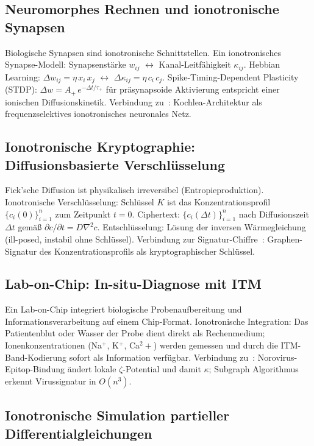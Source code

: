 ﻿\documentclass[a4paper,12pt]{article}
\theoremstyle{plain}
\theoremstyle{definition}
\theoremstyle{remark}
\begin{document}
\subsection{Neuromorphes Rechnen und ionotronische Synapsen}

Biologische Synapsen sind ionotronische Schnittstellen.
Ein ionotronisches Synapse-Modell:
Synapsenstärke $w_{ij}$ $\leftrightarrow$ Kanal-Leitfähigkeit $\kappa_{ij}$.
Hebbian Learning: $\Delta w_{ij} = \eta\,x_i\,x_j$
$\leftrightarrow$ $\Delta\kappa_{ij} = \eta\,c_i\,c_j$.
Spike-Timing-Dependent Plasticity (STDP):
$\Delta w = A_+\,e^{-\Delta t/\tau_+}$ f\"ur pr\"asynapsoide Aktivierung
entspricht einer ionischen Diffusionskinetik.
Verbindung zu~\cite{epp2026nf6}: Kochlea-Architektur als frequenzselektives
ionotronisches neuronales Netz.

\subsection{Ionotronische Kryptographie: Diffusionsbasierte Verschl\"usselung}

Fick'sche Diffusion ist physikalisch irreversibel (Entropieproduktion).
Ionotronische Verschl\"usselung: Schlüssel $K$ ist das Konzentrationsprofil
$\{c_i(0)\}_{i=1}^n$ zum Zeitpunkt $t=0$.
Ciphertext: $\{c_i(\Delta t)\}_{i=1}^n$ nach Diffusionszeit $\Delta t$
gem\"a{\ss} $\partial c/\partial t = D\nabla^2 c$.
Entschl\"usselung: L\"osung der inversen W\"armegleichung (ill-posed, instabil
ohne Schl\"ussel).
Verbindung zur Signatur-Chiffre~\cite{epp2026sigchiffre}:
Graphen-Signatur des Konzentrationsprofils als kryptographischer Schl\"ussel.

\subsection{Lab-on-Chip: In-situ-Diagnose mit ITM}

Ein Lab-on-Chip integriert biologische Probenaufbereitung und
Informationsverarbeitung auf einem Chip-Format.
Ionotronische Integration: Das Patientenblut oder Wasser der Probe
dient direkt als Rechenmedium; Ionenkonzentrationen (Na$^+$, K$^+$, Ca$^2+$)
werden gemessen und durch die ITM-Band-Kodierung sofort als Information
verfügbar.
Verbindung zu~\cite{epp2026norovirus}: Norovirus-Epitop-Bindung \"andert
lokale $\zeta$-Potential und damit $\kappa$; Subgraph Algorithmus
erkennt Virussignatur in $O(n^3)$.

\subsection{Ionotronische Simulation partieller Differentialgleichungen}
\end{document}

